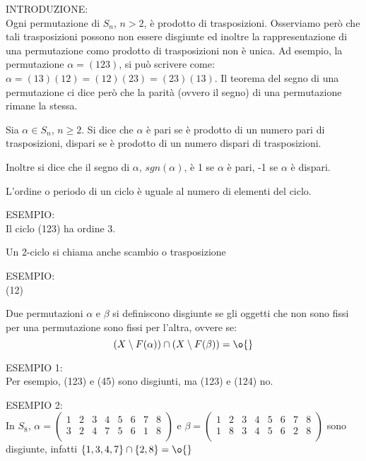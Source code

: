 INTRODUZIONE: \\
Ogni permutazione di $S_n$, $n>2$, è prodotto di trasposizioni. Osserviamo però che tali trasposizioni possono non essere
disgiunte ed inoltre la rappresentazione di una permutazione como prodotto di trasposizioni non è unica. Ad esempio, la permutazione
$\alpha=(123)$, si può scrivere come: $\alpha=(13)(12)=(12)(23)=(23)(13)$. Il teorema del segno di una permutazione ci dice
però che la parità (ovvero il segno) di una permutazione rimane la stessa.

\begin{definizione}
Sia $\alpha \in S_n$, $n \geq 2$. Si dice che $\alpha$ è pari se è prodotto di un numero pari di trasposizioni, dispari se è prodotto di un 
numero dispari di trasposizioni.

Inoltre si dice che il segno di $\alpha$, $sgn(\alpha)$, è 1 se $\alpha$ è pari, -1 se $\alpha$ è dispari.
\end{definizione}

\begin{definizione}
L'ordine o periodo di un ciclo è uguale al numero di elementi del ciclo.
\end{definizione}

ESEMPIO: \\
Il ciclo (123) ha ordine 3.



\begin{definizione}
Un 2-ciclo si chiama anche scambio o trasposizione
\end{definizione}

ESEMPIO: \\
(12)

\begin{definizione}
Due permutazioni $\alpha$ e $\beta$ si definiscono disgiunte se gli oggetti che non sono fissi per una permutazione
sono fissi per l'altra, ovvere se:
\[
 (X \setminus F(\alpha))\cap (X \setminus F(\beta))=\o{}
\]
\end{definizione}

ESEMPIO 1: \\
Per esempio, (123) e (45) sono disgiunti, ma (123) e (124) no. 

ESEMPIO 2: \\
In $S_{8}$, $\alpha = \left( \begin{array}{cccccccc} 1 & 2 & 3 & 4 & 5 & 6 & 7 & 8 \\ 3 & 2 & 4 & 7 & 5 & 6 & 1 & 8 \\ \end{array} \right)$
e $\beta = \left( \begin{array}{cccccccc} 1 & 2 & 3 & 4 & 5 & 6 & 7 & 8 \\ 1 & 8 & 3 & 4 & 5 & 6 & 2 & 8 \\ \end{array} \right)$
sono disgiunte, infatti $\{ 1,3,4,7 \} \cap \{ 2,8 \} = \o{}$


